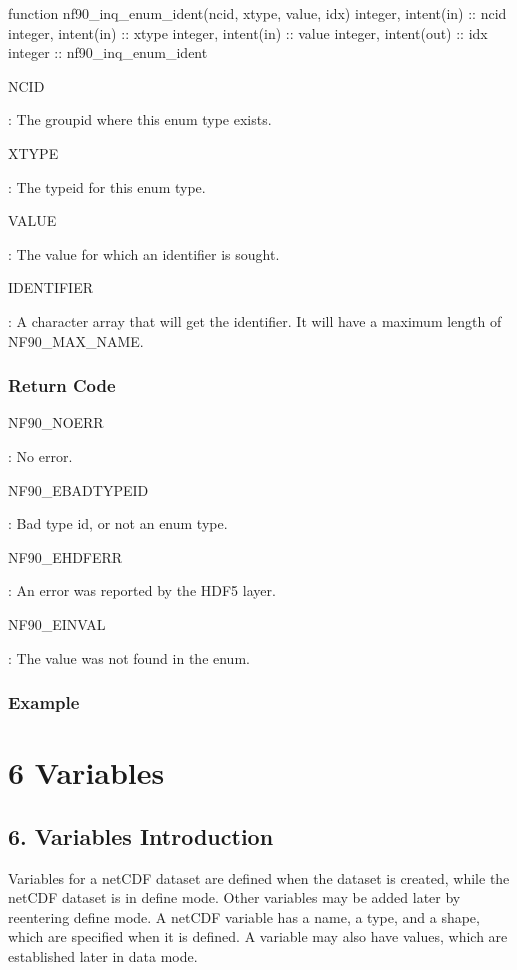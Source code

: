 \begin{DoxyCode}
\textcolor{keyword}{function }nf90\_inq\_enum\_ident(ncid, xtype, value, idx)
  \textcolor{keywordtype}{integer}, \textcolor{keywordtype}{intent(in)} :: ncid
  \textcolor{keywordtype}{integer}, \textcolor{keywordtype}{intent(in)} :: xtype
  \textcolor{keywordtype}{integer}, \textcolor{keywordtype}{intent(in)} :: value
  \textcolor{keywordtype}{integer}, \textcolor{keywordtype}{intent(out)} :: idx
  \textcolor{keywordtype}{integer} :: nf90\_inq\_enum\_ident
\end{DoxyCode}


{\ttfamily N\+C\+ID}

\+: The groupid where this enum type exists.

{\ttfamily X\+T\+Y\+PE}

\+: The typeid for this enum type.

{\ttfamily V\+A\+L\+UE}

\+: The value for which an identifier is sought.

{\ttfamily I\+D\+E\+N\+T\+I\+F\+I\+ER}

\+: A character array that will get the identifier. It will have a maximum length of N\+F90\+\_\+\+M\+A\+X\+\_\+\+N\+A\+ME.

\subsubsection*{Return Code}

{\ttfamily N\+F90\+\_\+\+N\+O\+E\+RR}

\+: No error.

{\ttfamily N\+F90\+\_\+\+E\+B\+A\+D\+T\+Y\+P\+E\+ID}

\+: Bad type id, or not an enum type.

{\ttfamily N\+F90\+\_\+\+E\+H\+D\+F\+E\+RR}

\+: An error was reported by the H\+D\+F5 layer.

{\ttfamily N\+F90\+\_\+\+E\+I\+N\+V\+AL}

\+: The value was not found in the enum.

\subsubsection*{Example}\hypertarget{f90-variables}{}\section{6 Variables}\label{f90-variables}
\hypertarget{f90-variables_f90-variables-introduction}{}\subsection{6. Variables Introduction }\label{f90-variables_f90-variables-introduction}
Variables for a net\+C\+DF dataset are defined when the dataset is created, while the net\+C\+DF dataset is in define mode. Other variables may be added later by reentering define mode. A net\+C\+DF variable has a name, a type, and a shape, which are specified when it is defined. A variable may also have values, which are established later in data mode.

